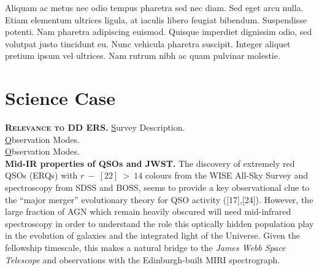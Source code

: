 \documentclass[11pt,epsf]{article}
\begin{document}
\noindent
Aliquam ac metus nec odio tempus pharetra sed nec diam. Sed eget arcu
nulla. Etiam elementum ultrices ligula, at iaculis libero feugiat
bibendum. Suspendisse potenti. Nam pharetra adipiscing
euismod. Quisque imperdiet dignissim odio, sed volutpat justo
tincidunt eu. Nunc vehicula pharetra suscipit. Integer aliquet pretium
ipsum vel ultrices. Nam rutrum nibh ac quam pulvinar molestie.


\newpage
\medskip
\medskip
\section{Science Case}

\smallskip
\smallskip
\noindent
\textbf{\textsc{Relevance to DD ERS.}} 
{\underline Survey Description.}\\

{\underline Observation Modes.}\\

{\underline Observation Modes.}\\




\smallskip
\smallskip
\noindent
{\bf Mid-IR properties of QSOs and JWST.} 
The discovery of extremely red QSOs (ERQs) with $r~-~[22]~>~14$
colours from the WISE All-Sky Survey and spectroscopy from SDSS and
BOSS, seems to provide a key observational clue to the ``major
merger'' evolutionary theory for QSO activity ([17],[24]).
However, the large fraction of AGN which remain heavily obscured will
need mid-infrared spectroscopy in order to understand the role this
optically hidden population play in the evolution of galaxies and the
integrated light of the Universe. Given the fellowship timescale, this
makes a natural bridge to the {\it James Webb Space Telescope} and
observations with the Edinburgh-built MIRI spectrograph.
\end{document}
